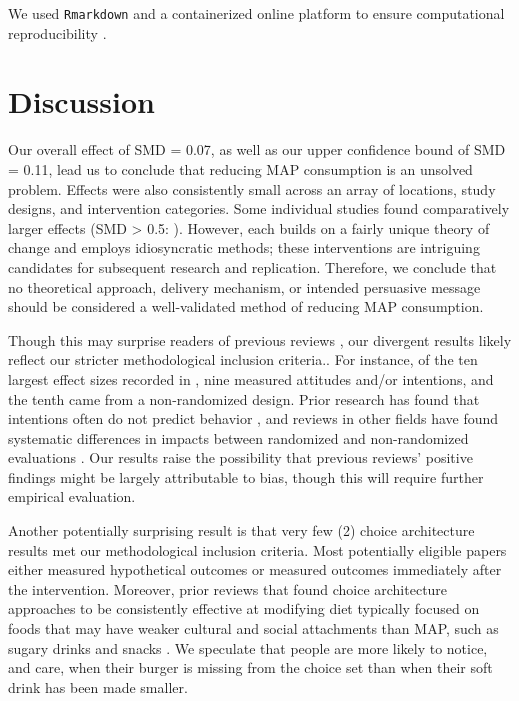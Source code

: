 \documentclass[sn-nature,referee,pdflatex]{sn-jnl}
\begin{document}
We used \texttt{Rmarkdown} \citep{xie2018} and a containerized
\citep{moreau2023} online platform \citep{clyburne2019} to ensure
computational reproducibility \citep{polanin2020}.

\section{Discussion}\label{discussion}

Our overall effect of SMD = 0.07, as well as our upper confidence bound
of SMD = 0.11, lead us to conclude that reducing MAP consumption is an
unsolved problem. Effects were also consistently small across an array
of locations, study designs, and intervention categories. Some
individual studies found comparatively larger effects (SMD
\textgreater{} 0.5:
\citep{carfora2023, merrill2009, kanchanachitra2020, bianchi2022, piester2020}).
However, each builds on a fairly unique theory of change and employs
idiosyncratic methods; these interventions are intriguing candidates for
subsequent research and replication. Therefore, we conclude that no
theoretical approach, delivery mechanism, or intended persuasive message
should be considered a well-validated method of reducing MAP
consumption.

Though this may surprise readers of previous reviews
\citep{mathur2021meta, meier2022, mertens2022}, our divergent results
likely reflect our stricter methodological inclusion criteria.. For
instance, of the ten largest effect sizes recorded in
\citep{mathur2021effectiveness}, nine measured attitudes and/or
intentions, and the tenth came from a non-randomized design. Prior
research has found that intentions often do not predict behavior
\citep{mathur202effectiveness}, and reviews in other fields have found
systematic differences in impacts between randomized and non-randomized
evaluations \citep{porat2024, stevenson2023}. Our results raise the
possibility that previous reviews' positive findings might be largely
attributable to bias, though this will require further empirical
evaluation.

Another potentially surprising result is that very few (2) choice
architecture results met our methodological inclusion criteria. Most
potentially eligible papers either measured hypothetical outcomes or
measured outcomes immediately after the intervention. Moreover, prior
reviews that found choice architecture approaches to be consistently
effective at modifying diet typically focused on foods that may have
weaker cultural and social attachments than MAP, such as sugary drinks
and snacks \citep{venema2022, adriaanse2009}. We speculate that people
are more likely to notice, and care, when their burger is missing from
the choice set than when their soft drink has been made smaller.
\end{document}
